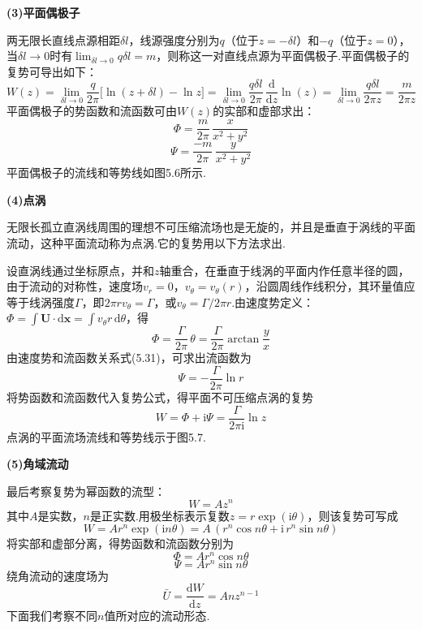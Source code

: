 \textbf{(3)平面偶极子}

两无限长直线点源相距$\delta l$，线源强度分别为$q$（位于$z=-\delta l$）和$-q$（位于$z=0$），当$\delta l\to 0$时有$\displaystyle\lim_{\delta l\to 0}q\delta l=m$，则称这一对直线点源为平面偶极子.平面偶极子的复势可导出如下：
\begin{equation*}
W(z)=\lim_{\delta l\to 0}\frac{q}{2\pi}\big[\ln(z+\delta l)-\ln z\big]=\lim_{\delta l\to 0}\frac{q\delta l}{2\pi}\,\frac{\mathrm{d}}{\mathrm{d}z}\ln(z)=\lim_{\delta l\to 0}\frac{q\delta l}{2\pi z}=\frac{m}{2\pi z}
\tag{5.43}
\end{equation*}
平面偶极子的势函数和流函数可由$W(z)$的实部和虚部求出：
\begin{equation*}
\Phi=\frac{m}{2\pi}\,\frac{x}{x^{2}+y^{2}}
\tag{5.44}
\end{equation*}
\begin{equation*}
\Psi=\frac{-m}{2\pi}\,\frac{y}{x^{2}+y^{2}}
\tag{5.45}
\end{equation*}
平面偶极子的流线和等势线如图5.6所示.

\textbf{(4)点涡}

无限长孤立直涡线周围的理想不可压缩流场也是无旋的，并且是垂直于涡线的平面流动，这种平面流动称为点涡.它的复势用以下方法求出.

设直涡线通过坐标原点，并和$z$轴重合，在垂直于线涡的平面内作任意半径的圆，由于流动的对称性，速度场$v_r=0$，$v_\theta=v_\theta(r)$，沿圆周线作线积分，其环量值应等于线涡强度$\Gamma$，即$2\pi rv_\theta=\Gamma$，或$v_\theta=\Gamma/2\pi r$.由速度势定义：$\Phi=\displaystyle\int\boldsymbol{U}\cdot\mathrm{d}\boldsymbol{x}=\int v_\theta r\,\mathrm{d}\theta$，得
\begin{equation*}
\Phi=\frac{\Gamma}{2\pi}\,\theta=\frac{\Gamma}{2\pi}\arctan\frac{y}{x}
\tag{5.46a}
\end{equation*}
由速度势和流函数关系式(5.31)，可求出流函数为
\begin{equation*}
\Psi=-\frac{\Gamma}{2\pi}\ln r
\tag{5.46b}
\end{equation*}
将势函数和流函数代入复势公式，得平面不可压缩点涡的复势
\begin{equation*}
W=\Phi+\mathrm{i}\Psi=\frac{\Gamma}{2\pi\mathrm{i}}\ln z
\tag{5.47}
\end{equation*}
点涡的平面流场流线和等势线示于图5.7.

\textbf{(5)角域流动}

最后考察复势为幂函数的流型：
\begin{equation*}
W=Az^{n}
\tag{5.48}
\end{equation*}
其中$A$是实数，$n$是正实数.用极坐标表示复数$z=r\exp(\mathrm{i}\theta)$，则该复势可写成
\[
W=Ar^{n}\exp(\mathrm{i}n\theta)=A\,(r^{n}\cos n\theta+\mathrm{i}\,r^{n}\sin n\theta)
\]
将实部和虚部分离，得势函数和流函数分别为
\begin{equation*}
\Phi=Ar^{n}\cos n\theta
\tag{5.49}
\end{equation*}
\begin{equation*}
\Psi=Ar^{n}\sin n\theta
\tag{5.50}
\end{equation*}
绕角流动的速度场为
\begin{equation*}
\bar{U}=\frac{\mathrm{d}W}{\mathrm{d}z}=Anz^{n-1}
\tag{5.51}
\end{equation*}
下面我们考察不同$n$值所对应的流动形态.

